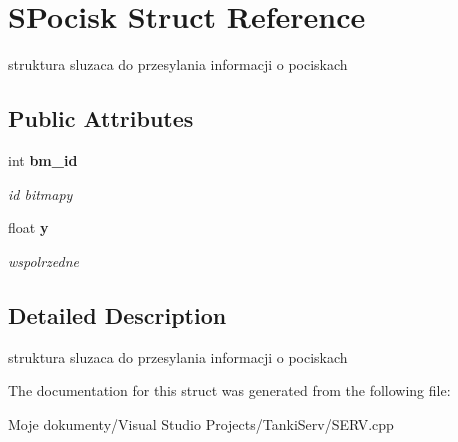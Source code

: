 \section{SPocisk Struct Reference}
\label{struct_s_pocisk}
struktura sluzaca do przesylania informacji o pociskach  


\subsection*{Public Attributes}
\begin{CompactItemize}
\item 
int {\bf bm\_\-id}\label{struct_s_pocisk_78d42b81c730283c119e40bf27211c9d}

\begin{CompactList}\small\item\em id bitmapy \item\end{CompactList}\item 
float {\bf y}\label{struct_s_pocisk_67f8fe9ab90d7a06431f77c1377b3d47}

\begin{CompactList}\small\item\em wspolrzedne \item\end{CompactList}\end{CompactItemize}


\subsection{Detailed Description}
struktura sluzaca do przesylania informacji o pociskach 



The documentation for this struct was generated from the following file:\begin{CompactItemize}
\item 
Moje dokumenty/Visual Studio Projects/TankiServ/SERV.cpp\end{CompactItemize}
